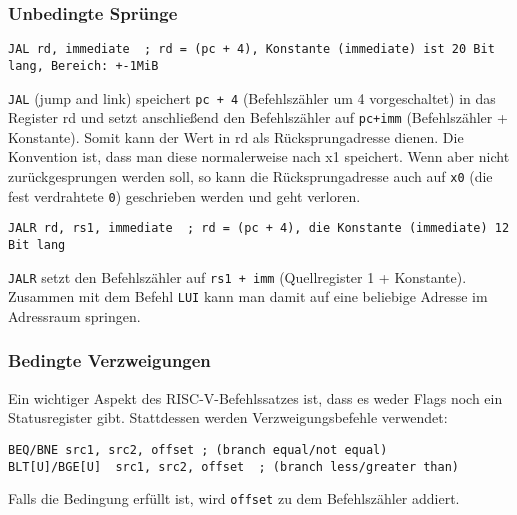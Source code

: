 \subsubsection{Unbedingte Sprünge}

\begin{lstlisting}[style=risc-v_Assembler]
JAL rd, immediate  ; rd = (pc + 4), Konstante (immediate) ist 20 Bit lang, Bereich: +-1MiB
\end{lstlisting}

\lstinline[style=risc-v_Assembler]!JAL! (jump and link) speichert \lstinline[style=risc-v_Assembler]!pc + 4! (Befehlszähler um 4 vorgeschaltet) in das Register rd und setzt anschließend den Befehlszähler auf \lstinline[style=risc-v_Assembler]!pc+imm! (Befehlszähler + Konstante). Somit kann der Wert in rd als Rücksprungadresse dienen. Die Konvention ist, dass man diese normalerweise nach x1 speichert. Wenn aber nicht zurückgesprungen werden soll, so kann die Rücksprungadresse auch auf \lstinline[style=risc-v_Assembler]!x0! (die fest verdrahtete \lstinline[style=risc-v_Assembler]!0!) geschrieben werden und geht verloren.

\begin{lstlisting}[style=risc-v_Assembler]
JALR rd, rs1, immediate  ; rd = (pc + 4), die Konstante (immediate) 12 Bit lang
\end{lstlisting}

\lstinline[style=risc-v_Assembler]!JALR! setzt den Befehlszähler auf \lstinline[style=risc-v_Assembler]!rs1 + imm! (Quellregister 1 + Konstante). Zusammen mit dem Befehl \lstinline[style=risc-v_Assembler]!LUI! kann
man damit auf eine beliebige Adresse im Adressraum springen.

\subsubsection{Bedingte Verzweigungen}

Ein wichtiger Aspekt des RISC-V-Befehlssatzes ist, dass es weder Flags noch ein Statusregister gibt. Stattdessen
werden Verzweigungsbefehle verwendet:

\begin{lstlisting}[style=risc-v_Assembler]
BEQ/BNE src1, src2, offset ; (branch equal/not equal)
BLT[U]/BGE[U]  src1, src2, offset  ; (branch less/greater than)
\end{lstlisting}

Falls die Bedingung erfüllt ist, wird \lstinline[style=risc-v_Assembler]!offset! zu dem Befehlszähler addiert.

